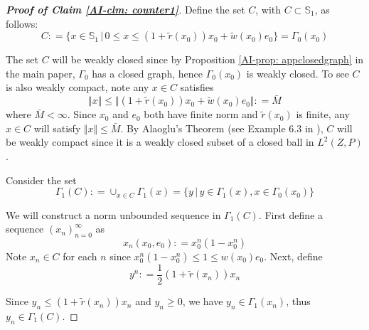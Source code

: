 \documentclass[12pt]{ectaart}
\newcommand{\1}{\mathbbm 1}
\theoremstyle{plain}
\theoremstyle{definition}
\begin{document}
	\begin{proof}[\textbf{Proof of Claim \ref{AI-clm: counter1}}]
	
	Define the set $C$, with $C\subset \mathbb{S}_{1}$, as follows:
	\begin{equation*}
	C \colon = \{x\in \mathbb{S}_{1}\,\vert\, 0 \leq x \leq (1+\tilde{r}(x_{0}))x_{0} + \tilde{w}(x_{0})e_{0}\} = \Gamma_{0}(x_{0})
	\end{equation*}
	
	The set $C$ will be weakly closed since by Proposition \ref{AI-prop: appclosedgraph} in the main paper, $\Gamma_{0}$ has a closed graph, hence $\Gamma_{0}(x_{0})$ is weakly closed. To see $C$ is also weakly compact, note any $x\in C$ satisfies 
	\begin{equation*}
	\Vert x\Vert \leq \Vert (1+\tilde{r}(x_{0}))x_{0} + \tilde{w}(x_{0})e_{0}\Vert\colon = \bar{M}
	\end{equation*}
	where $\bar{M}<\infty$. Since $x_{0}$ and $e_{0}$ both have finite norm and $\tilde{r}(x_{0})$ is finite,  any $x\in C$ will satisfy $\Vert x \Vert \leq \bar{M}$. By Alaoglu's Theorem (see Example 6.3 in \cite{Andreu1991}), $C$ will be weakly compact since it is a weakly closed subset of a closed ball in $L^{2}(Z,P)$.
	
	
	Consider the set 
	\begin{equation*}
	\Gamma_{1}(C)\colon =\cup_{x\in C}\Gamma_{1}(x) = \{y\,\vert\, y\in \Gamma_{1}(x),x\in \Gamma_{0}(x_{0})\}
	\end{equation*}
	
	We will construct a norm unbounded sequence in $\Gamma_{1}(C)$. First define a sequence $(x_{n})_{n=0}^{\infty}$ as $$x_{n}(x_{0},e_{0})\colon = x_{0}^{n}(1-x_{0}^{n})$$
	Note $x_{n}\in C$ for each $n$ since $x_{0}^{n}(1-x_{0}^{n}) \leq 1 \leq w(x_{0})e_{0}$. Next, define $$y^{n}\colon = \frac{1}{2}(1+\tilde{r}(x_{n}))x_{n}$$
	
	Since $y_{n}\leq (1+\tilde{r}(x_{n}))x_{n}$ and $y_{n} \geq 0$, we have $y_{n}\in \Gamma_{1}(x_{n})$, thus $y_{n}\in \Gamma_{1}(C)$.
	

\end{proof}
\end{document}
